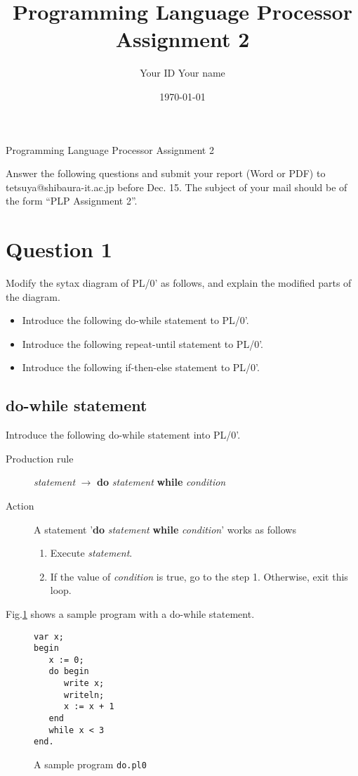 \documentclass{article}
\title{Programming Language Processor \\ Assignment 2}
\author{Your ID   Your name}
\date{\today}
\begin{document}
\ifreport
\maketitle
\else
\begin{center}
{\huge Programming Language Processor Assignment 2}
\end{center}
Answer the following questions and submit your report (Word or PDF) to
tetsuya@shibaura-it.ac.jp before Dec. 15. 
The subject of your mail should be of the form ``PLP Assignment 2''.
\fi


\section*{Question 1}
Modify the sytax diagram of PL/0' as follows, and explain the modified parts of the diagram.
\begin{itemize}
 \item Introduce the following do-while statement to PL/0'.
 \item Introduce the following repeat-until statement to PL/0'.
 \item Introduce the following if-then-else statement to PL/0'.
\end{itemize}


\subsection*{do-while statement}
Introduce the following do-while statement into PL/0'.
\begin{description}
 \item[Production rule] {\it statement}  $\to$ {\bf do} {\it statement} {\bf while} {\it condition}
 \item[Action] A statement '{\bf do} {\it statement} {\bf while} {\it condition}' works as follows
	    \begin{enumerate}
	     \item Execute {\it statement}.
	     \item If the value of {\it condition} is true, go to the step 1. Otherwise, exit this loop.
	    \end{enumerate}
\end{description}

Fig.\ref{fig:do-while} shows a sample program with a do-while statement.
\begin{figure}[h]
\begin{verbatim}
var x;
begin
   x := 0;
   do begin
      write x;
      writeln;
      x := x + 1
   end
   while x < 3
end.
\end{verbatim}
\caption{A sample program {\tt do.pl0}}\label{fig:do-while}
\end{figure}
\end{document}
